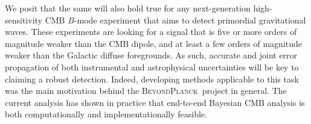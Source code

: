 \documentclass[twocolumn]{aa}
\newcommand{\BP}{\textsc{BeyondPlanck}}
\begin{document}
We posit that the same will also hold true for any next-generation
high-sensitivity CMB $B$-mode experiment that aims to detect
primordial gravitational waves. These experiments are looking for a
signal that is five or more orders of magnitude weaker than the CMB
dipole, and at least a few orders of magnitude weaker than the
Galactic diffuse foregrounds. As such, accurate and joint error
propagation of both instrumental and astrophysical uncertainties will
be key to claiming a robust detection. Indeed, developing methods
applicable to this task was the main motivation behind the
\BP\ project in general. The current analysis has shown in practice
that end-to-end Bayesian CMB analysis is both computationally and
implementationally feasible.








\end{document}
